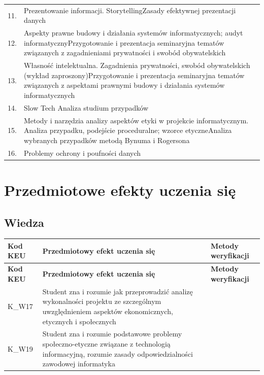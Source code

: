 \documentclass[12pt, a4paper]{article}
\newcommand{\thdrule}{\noalign{\global\setlength{\extrarowheight}{0pt}}}
\newcommand{\thdend}{\noalign{\global\setlength{\extrarowheight}{3pt}}}
\begin{document}
{\begin{longtable}{m{1.5cm}m{14.5cm}}
  \rowcolor{tableRowLight} 11. & Prezentowanie informacji. StorytellingZasady efektywnej prezentacji danych \\
  \rowcolor{tableRowAlt} 12. & Aspekty prawne budowy i działania systemów informatycznych; audyt informatycznyPrzygotowanie i prezentacja seminaryjna tematów związanych z zagadnieniami prywatności i swobód obywatelskich \\
  \rowcolor{tableRowLight} 13. & Własność intelektualna. Zagadnienia prywatności, swobód obywatelskich (wykład zaproszony)Przygotowanie i prezentacja seminaryjna tematów związanych z aspektami prawnymi budowy i działania systemów informatycznych \\
  \rowcolor{tableRowAlt} 14. & Slow Tech Analiza studium przypadków \\
  \rowcolor{tableRowLight} 15. & Metody i narzędzia analizy aspektów etyki w projekcie informatycznym. Analiza przypadku, podejście proceduralne; wzorce etyczneAnaliza wybranych przypadków metodą Bynuma i Rogersona \\
  \rowcolor{tableRowAlt} 16. & Problemy ochrony i poufności danych \\
\bottomrule
\end{longtable}}

\section{Przedmiotowe efekty uczenia się}

\subsection*{Wiedza}
{\scriptsize
\begin{longtable}{m{1.6cm}m{9.0cm}m{4.2cm}}
\thdrule\toprule
\rowcolor{pjatkRed} {\color{white}\footnotesize\textbf{\vphantom{Ag}Kod KEU}} & {\color{white}\footnotesize\textbf{\vphantom{Ag}Przedmiotowy efekt uczenia się}} & {\color{white}\footnotesize\textbf{\vphantom{Ag}Metody weryfikacji}} \\
\midrule\thdend
\endfirsthead
\thdrule\toprule
\rowcolor{pjatkRed} {\color{white}\footnotesize\textbf{\vphantom{Ag}Kod KEU}} & {\color{white}\footnotesize\textbf{\vphantom{Ag}Przedmiotowy efekt uczenia się}} & {\color{white}\footnotesize\textbf{\vphantom{Ag}Metody weryfikacji}} \\
\midrule\thdend
\endhead
  \rowcolor{tableRowLight} K\_W17 & Student zna i rozumie jak przeprowadzić analizę wykonalności projektu ze szczególnym uwzględnieniem aspektów ekonomicznych, etycznych i społecznych &  \\
  \rowcolor{tableRowAlt} K\_W19 & Student zna i rozumie podstawowe problemy społeczno-etyczne związane z technologią informacyjną, rozumie zasady odpowiedzialności zawodowej informatyka &  \\
\bottomrule
\end{longtable}}
\end{document}
